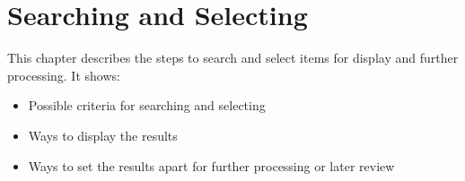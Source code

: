 
\chapter{Searching and Selecting}
\label{cha:rgsea}

This chapter describes the steps to search and select items for
display and further processing. It shows:
\begin{itemize}
\item Possible criteria for searching and selecting
\item Ways to display the results 
\item Ways to set the results apart for further processing or later
  review 
\end{itemize}








